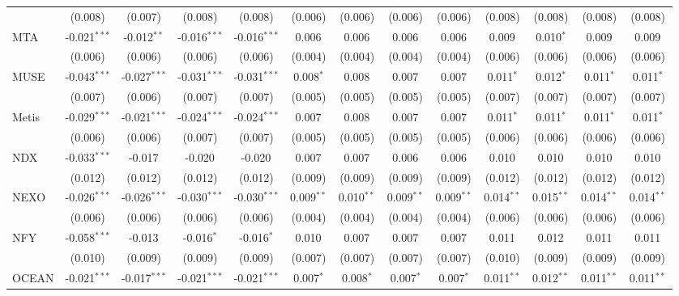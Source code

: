 \begin{table}[!htbp]
\begin{tabular}{@{\extracolsep{5pt}}lcccccccccccc}
  & (0.008) & (0.007) & (0.008) & (0.008) & (0.006) & (0.006) & (0.006) & (0.006) & (0.008) & (0.008) & (0.008) & (0.008) \\
 MTA & -0.021$^{***}$ & -0.012$^{**}$ & -0.016$^{***}$ & -0.016$^{***}$ & 0.006$^{}$ & 0.006$^{}$ & 0.006$^{}$ & 0.006$^{}$ & 0.009$^{}$ & 0.010$^{*}$ & 0.009$^{}$ & 0.009$^{}$ \\
  & (0.006) & (0.006) & (0.006) & (0.006) & (0.004) & (0.004) & (0.004) & (0.004) & (0.006) & (0.006) & (0.006) & (0.006) \\
 MUSE & -0.043$^{***}$ & -0.027$^{***}$ & -0.031$^{***}$ & -0.031$^{***}$ & 0.008$^{*}$ & 0.008$^{}$ & 0.007$^{}$ & 0.007$^{}$ & 0.011$^{*}$ & 0.012$^{*}$ & 0.011$^{*}$ & 0.011$^{*}$ \\
  & (0.007) & (0.006) & (0.007) & (0.007) & (0.005) & (0.005) & (0.005) & (0.005) & (0.007) & (0.007) & (0.007) & (0.007) \\
 Metis & -0.029$^{***}$ & -0.021$^{***}$ & -0.024$^{***}$ & -0.024$^{***}$ & 0.007$^{}$ & 0.008$^{}$ & 0.007$^{}$ & 0.007$^{}$ & 0.011$^{*}$ & 0.011$^{*}$ & 0.011$^{*}$ & 0.011$^{*}$ \\
  & (0.006) & (0.006) & (0.007) & (0.007) & (0.005) & (0.005) & (0.005) & (0.005) & (0.006) & (0.006) & (0.006) & (0.006) \\
 NDX & -0.033$^{***}$ & -0.017$^{}$ & -0.020$^{}$ & -0.020$^{}$ & 0.007$^{}$ & 0.007$^{}$ & 0.006$^{}$ & 0.006$^{}$ & 0.010$^{}$ & 0.010$^{}$ & 0.010$^{}$ & 0.010$^{}$ \\
  & (0.012) & (0.012) & (0.012) & (0.012) & (0.009) & (0.009) & (0.009) & (0.009) & (0.012) & (0.012) & (0.012) & (0.012) \\
 NEXO & -0.026$^{***}$ & -0.026$^{***}$ & -0.030$^{***}$ & -0.030$^{***}$ & 0.009$^{**}$ & 0.010$^{**}$ & 0.009$^{**}$ & 0.009$^{**}$ & 0.014$^{**}$ & 0.015$^{**}$ & 0.014$^{**}$ & 0.014$^{**}$ \\
  & (0.006) & (0.006) & (0.006) & (0.006) & (0.004) & (0.004) & (0.004) & (0.004) & (0.006) & (0.006) & (0.006) & (0.006) \\
 NFY & -0.058$^{***}$ & -0.013$^{}$ & -0.016$^{*}$ & -0.016$^{*}$ & 0.010$^{}$ & 0.007$^{}$ & 0.007$^{}$ & 0.007$^{}$ & 0.011$^{}$ & 0.012$^{}$ & 0.011$^{}$ & 0.011$^{}$ \\
  & (0.010) & (0.009) & (0.009) & (0.009) & (0.007) & (0.007) & (0.007) & (0.007) & (0.010) & (0.009) & (0.009) & (0.009) \\
 OCEAN & -0.021$^{***}$ & -0.017$^{***}$ & -0.021$^{***}$ & -0.021$^{***}$ & 0.007$^{*}$ & 0.008$^{*}$ & 0.007$^{*}$ & 0.007$^{*}$ & 0.011$^{**}$ & 0.012$^{**}$ & 0.011$^{**}$ & 0.011$^{**}$ \\

\end{tabular}
\end{table}
